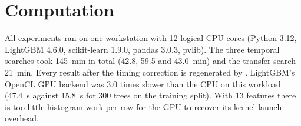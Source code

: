 \section{Computation}
\label{sec:s-compute}

All experiments ran on one workstation with 12 logical CPU cores (Python 3.12, LightGBM 4.6.0, scikit-learn 1.9.0, pandas 3.0.3, pvlib). The three temporal searches took 145~min in total (42.8, 59.5 and 43.0~min) and the transfer search 21~min. Every result after the timing correction is regenerated by . LightGBM's OpenCL GPU backend was 3.0 times slower than the CPU on this workload (47.4~s against 15.8~s for 300 trees on the training split). With 13 features there is too little histogram work per row for the GPU to recover its kernel-launch overhead.

